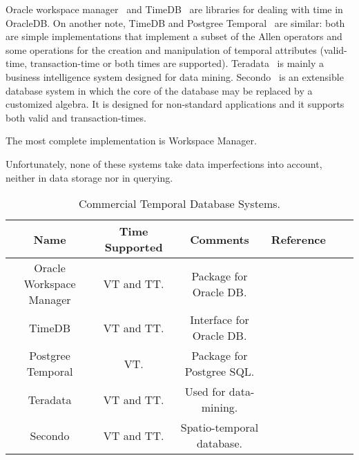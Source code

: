 Oracle workspace manager~\cite{oracle2009} and TimeDB~\cite{timedb2005} are libraries for dealing with time in OracleDB. On another note, TimeDB and Postgree Temporal~\cite{posgree2009} are similar: both are simple implementations that implement a subset of the Allen operators and some operations for the creation and manipulation of temporal attributes (valid-time, transaction-time or both times are supported). Teradata~\cite{teradata2011} is mainly a business intelligence system designed for data mining. Secondo~\cite{Dieker2000} is an extensible database system in which the core of the database may be replaced by a customized algebra. It is designed for non-standard applications and it supports both valid and transaction-times. 

 The most complete implementation is Workspace Manager.

Unfortunately, none of these systems take data imperfections into account, neither in data storage nor in querying.

\begin{table}
\centering
\caption{Commercial Temporal Database Systems. }
\begin{tabular}{c c c c c c }
\hline
\textbf{Name} & \textbf{Time Supported} & \textbf{Comments} & \textbf{Reference}  \\ \hline
Oracle Workspace Manager & VT and TT. & Package for Oracle DB. & \cite{oracle2009}\\
TimeDB & VT and TT. & Interface for Oracle DB. & \cite{timedb2005}\\
Postgree Temporal & VT. & Package for Postgree SQL. & \cite{posgree2009}\\
Teradata & VT and TT. & Used for data-mining. & \cite{teradata2011}\\
Secondo & VT and TT. & Spatio-temporal database. & \cite{Guting} \\
\hline 
\end{tabular}
\label{table:commercial-temporal-db}



\end{table}

